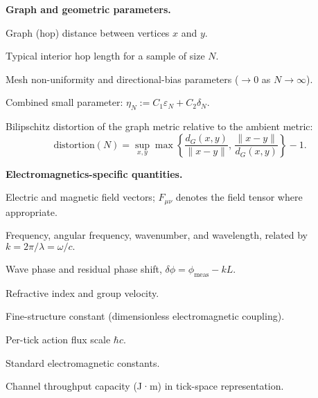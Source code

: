 \noindent\textbf{Graph and geometric parameters.}
\begin{description}[leftmargin=2.4em,labelsep=0.8em]
  \item[\(d_G(x,y)\)] Graph (hop) distance between vertices \(x\) and \(y\).
  \item[\(\ell_N\)] Typical interior hop length for a sample of size \(N\).
  \item[\(\varepsilon_N,\,\delta_N\)] Mesh non-uniformity and directional-bias parameters (\(\to 0\) as \(N\to\infty\)).
  \item[\(\eta_N\)] Combined small parameter: \(\eta_N := C_1\varepsilon_N + C_2\delta_N.\)
  \item[\(\mathrm{distortion}(N)\)] Bilipschitz distortion of the graph metric relative to the ambient metric:
  \[
    \mathrm{distortion}(N)
      = \sup_{x,y}
        \max\!\left\{
          \frac{d_G(x,y)}{\|x-y\|},\,
          \frac{\|x-y\|}{d_G(x,y)}
        \right\}-1.
  \]
\end{description}

\noindent\textbf{Electromagnetics-specific quantities.}
\begin{description}[leftmargin=2.4em,labelsep=0.8em]
  \item[\(\mathbf{E},\,\mathbf{B}\)] Electric and magnetic field vectors; \(F_{\mu\nu}\) denotes the field tensor where appropriate.
  \item[\(\nu,\,\omega,\,k,\,\lambda\)] Frequency, angular frequency, wavenumber, and wavelength, related by \(k = 2\pi/\lambda = \omega/c.\)
  \item[\(\phi,\,\delta\phi\)] Wave phase and residual phase shift, \(\delta\phi = \phi_{\text{meas}} - kL.\)
  \item[\(n(\lambda),\,v_g\)] Refractive index and group velocity.
  \item[\(\alpha\)] Fine-structure constant (dimensionless electromagnetic coupling).
  \item[\(Q_{\max}\)] Per-tick action flux scale \(\hbar c\).
  \item[\(e,\,\epsilon_0,\,\mu_0,\,Z_0,\,R_K\)] Standard electromagnetic constants.
  \item[\(\mathcal Q\)] Channel throughput capacity (J·m) in tick-space representation.
\end{description}

